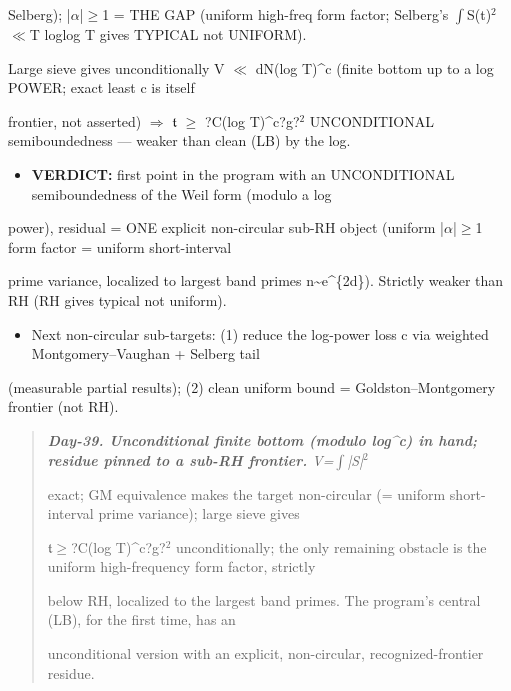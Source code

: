 \documentclass[10pt]{article}
\begin{document}
  Selberg); |\ensuremath{\alpha}|\ensuremath{\ge}1 = THE GAP (uniform high-freq form factor; Selberg's \ensuremath{\int}S(t)\ensuremath{^2}\ensuremath{\ll}T loglog T gives TYPICAL not UNIFORM).\par
  Large sieve gives unconditionally V \ensuremath{\ll} dN(log T)\textasciicircum{}c (finite bottom up to a log POWER; exact least c is itself\par
  frontier, not asserted) \ensuremath{\Rightarrow} \ensuremath{\mathfrak{t}} \ensuremath{\ge} ?C(log T)\textasciicircum{}c?g?\ensuremath{^2} UNCONDITIONAL semiboundedness --- weaker than clean (LB) by the log.\par
\begin{itemize}
\item \textbf{VERDICT:} first point in the program with an UNCONDITIONAL semiboundedness of the Weil form (modulo a log
\end{itemize}
  power), residual = ONE explicit non-circular sub-RH object (uniform |\ensuremath{\alpha}|\ensuremath{\ge}1 form factor = uniform short-interval\par
  prime variance, localized to largest band primes n\textasciitilde{}e\textasciicircum{}\{2d\}). Strictly weaker than RH (RH gives typical not uniform).\par
\begin{itemize}
\item Next non-circular sub-targets: (1) reduce the log-power loss c via weighted Montgomery--Vaughan + Selberg tail
\end{itemize}
  (measurable partial results); (2) clean uniform bound = Goldston--Montgomery frontier (not RH).\par

\begin{quote}\itshape
\textbf{Day-39. Unconditional finite bottom (modulo log\textasciicircum{}c) in hand; residue pinned to a sub-RH frontier.} V=\ensuremath{\int}|S|\ensuremath{^2}\par
exact; GM equivalence makes the target non-circular (= uniform short-interval prime variance); large sieve gives\par
\ensuremath{\mathfrak{t}}\ensuremath{\ge}?C(log T)\textasciicircum{}c?g?\ensuremath{^2} unconditionally; the only remaining obstacle is the uniform high-frequency form factor, strictly\par
below RH, localized to the largest band primes. The program's central (LB), for the first time, has an\par
unconditional version with an explicit, non-circular, recognized-frontier residue.\par
\end{quote}
\end{document}
